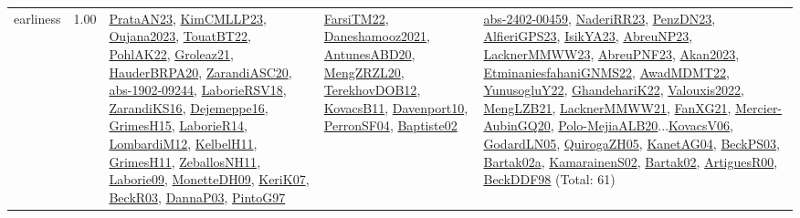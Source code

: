 {\begin{longtable}{p{3cm}r>{\raggedright\arraybackslash}p{6cm}>{\raggedright\arraybackslash}p{6cm}>{\raggedright\arraybackslash}p{8cm}}
\index{earliness}\index{Concepts!earliness}earliness &  1.00 & \hyperref[detail:PrataAN23]{PrataAN23}, \hyperref[detail:KimCMLLP23]{KimCMLLP23}, \hyperref[detail:Oujana2023]{Oujana2023}, \hyperref[detail:TouatBT22]{TouatBT22}, \hyperref[detail:PohlAK22]{PohlAK22}, \hyperref[detail:Groleaz21]{Groleaz21}, \hyperref[detail:HauderBRPA20]{HauderBRPA20}, \hyperref[detail:ZarandiASC20]{ZarandiASC20}, \hyperref[detail:abs-1902-09244]{abs-1902-09244}, \hyperref[detail:LaborieRSV18]{LaborieRSV18}, \hyperref[detail:ZarandiKS16]{ZarandiKS16}, \hyperref[detail:Dejemeppe16]{Dejemeppe16}, \hyperref[detail:GrimesH15]{GrimesH15}, \hyperref[detail:LaborieR14]{LaborieR14}, \hyperref[detail:LombardiM12]{LombardiM12}, \hyperref[detail:KelbelH11]{KelbelH11}, \hyperref[detail:GrimesH11]{GrimesH11}, \hyperref[detail:ZeballosNH11]{ZeballosNH11}, \hyperref[detail:Laborie09]{Laborie09}, \hyperref[detail:MonetteDH09]{MonetteDH09}, \hyperref[detail:KeriK07]{KeriK07}, \hyperref[detail:BeckR03]{BeckR03}, \hyperref[detail:DannaP03]{DannaP03}, \hyperref[detail:PintoG97]{PintoG97} & \hyperref[detail:FarsiTM22]{FarsiTM22}, \hyperref[detail:Daneshamooz2021]{Daneshamooz2021}, \hyperref[detail:AntunesABD20]{AntunesABD20}, \hyperref[detail:MengZRZL20]{MengZRZL20}, \hyperref[detail:TerekhovDOB12]{TerekhovDOB12}, \hyperref[detail:KovacsB11]{KovacsB11}, \hyperref[detail:Davenport10]{Davenport10}, \hyperref[detail:PerronSF04]{PerronSF04}, \hyperref[detail:Baptiste02]{Baptiste02} & \hyperref[detail:abs-2402-00459]{abs-2402-00459}, \hyperref[detail:NaderiRR23]{NaderiRR23}, \hyperref[detail:PenzDN23]{PenzDN23}, \hyperref[detail:AlfieriGPS23]{AlfieriGPS23}, \hyperref[detail:IsikYA23]{IsikYA23}, \hyperref[detail:AbreuNP23]{AbreuNP23}, \hyperref[detail:LacknerMMWW23]{LacknerMMWW23}, \hyperref[detail:AbreuPNF23]{AbreuPNF23}, \hyperref[detail:Akan2023]{Akan2023}, \hyperref[detail:EtminaniesfahaniGNMS22]{EtminaniesfahaniGNMS22}, \hyperref[detail:AwadMDMT22]{AwadMDMT22}, \hyperref[detail:YunusogluY22]{YunusogluY22}, \hyperref[detail:GhandehariK22]{GhandehariK22}, \hyperref[detail:Valouxis2022]{Valouxis2022}, \hyperref[detail:MengLZB21]{MengLZB21}, \hyperref[detail:LacknerMMWW21]{LacknerMMWW21}, \hyperref[detail:FanXG21]{FanXG21}, \hyperref[detail:Mercier-AubinGQ20]{Mercier-AubinGQ20}, \hyperref[detail:Polo-MejiaALB20]{Polo-MejiaALB20}...\hyperref[detail:KovacsV06]{KovacsV06}, \hyperref[detail:GodardLN05]{GodardLN05}, \hyperref[detail:QuirogaZH05]{QuirogaZH05}, \hyperref[detail:KanetAG04]{KanetAG04}, \hyperref[detail:BeckPS03]{BeckPS03}, \hyperref[detail:Bartak02a]{Bartak02a}, \hyperref[detail:KamarainenS02]{KamarainenS02}, \hyperref[detail:Bartak02]{Bartak02}, \hyperref[detail:ArtiguesR00]{ArtiguesR00}, \hyperref[detail:BeckDDF98]{BeckDDF98} (Total: 61)\\

\end{longtable}}
